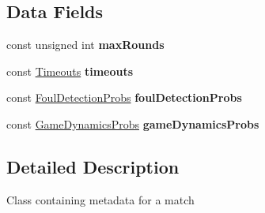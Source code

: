 \subsection*{Data Fields}
\begin{DoxyCompactItemize}
\item 
\hypertarget{classgame_model_1_1_config_a9690fb78b42fcb9310d55d89fb49079e}{const unsigned int {\bfseries max\-Rounds}}\label{classgame_model_1_1_config_a9690fb78b42fcb9310d55d89fb49079e}

\item 
\hypertarget{classgame_model_1_1_config_a5757760f64e95fdc55489414e5e6d52e}{const \hyperlink{structgame_model_1_1_timeouts}{Timeouts} {\bfseries timeouts}}\label{classgame_model_1_1_config_a5757760f64e95fdc55489414e5e6d52e}

\item 
\hypertarget{classgame_model_1_1_config_a810141306fe0e5f8d3c445fed3c898a5}{const \hyperlink{structgame_model_1_1_foul_detection_probs}{Foul\-Detection\-Probs} {\bfseries foul\-Detection\-Probs}}\label{classgame_model_1_1_config_a810141306fe0e5f8d3c445fed3c898a5}

\item 
\hypertarget{classgame_model_1_1_config_ad88e428a62281ff69051f424bd4966c2}{const \hyperlink{structgame_model_1_1_game_dynamics_probs}{Game\-Dynamics\-Probs} {\bfseries game\-Dynamics\-Probs}}\label{classgame_model_1_1_config_ad88e428a62281ff69051f424bd4966c2}

\end{DoxyCompactItemize}


\subsection{Detailed Description}
Class containing metadata for a match 

